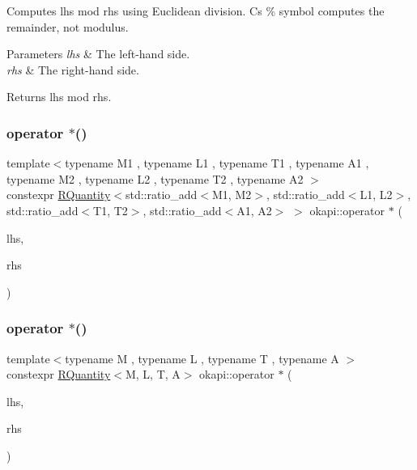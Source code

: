 Computes {\ttfamily lhs mod rhs} using Euclidean division. C\textquotesingle{}s {\ttfamily \%} symbol computes the remainder, not modulus.


\begin{DoxyParams}{Parameters}
{\em lhs} & The left-\/hand side. \\
\hline
{\em rhs} & The right-\/hand side. \\
\hline
\end{DoxyParams}
\begin{DoxyReturn}{Returns}
{\ttfamily lhs} mod {\ttfamily rhs}. 
\end{DoxyReturn}
\mbox{\label{namespaceokapi_a48bcd0bd9113d86c24325eb1003709de}} 
\subsubsection{\texorpdfstring{operator $\ast$()}{operator *()}\hspace{0.1cm}{\footnotesize\ttfamily [1/4]}}
{\footnotesize\ttfamily template$<$typename M1 , typename L1 , typename T1 , typename A1 , typename M2 , typename L2 , typename T2 , typename A2 $>$ \\
constexpr \mbox{\hyperlink{classokapi_1_1RQuantity}{R\+Quantity}}$<$std\+::ratio\+\_\+add$<$M1, M2$>$, std\+::ratio\+\_\+add$<$L1, L2$>$, std\+::ratio\+\_\+add$<$T1, T2$>$, std\+::ratio\+\_\+add$<$A1, A2$>$ $>$ okapi\+::operator $\ast$ (\begin{DoxyParamCaption}\item[{const \mbox{\hyperlink{classokapi_1_1RQuantity}{R\+Quantity}}$<$ M1, L1, T1, A1 $>$ \&}]{lhs,  }\item[{const \mbox{\hyperlink{classokapi_1_1RQuantity}{R\+Quantity}}$<$ M2, L2, T2, A2 $>$ \&}]{rhs }\end{DoxyParamCaption})}

\mbox{\label{namespaceokapi_a2ff902d0db2898d581528d1aa92f7005}} 
\subsubsection{\texorpdfstring{operator $\ast$()}{operator *()}\hspace{0.1cm}{\footnotesize\ttfamily [2/4]}}
{\footnotesize\ttfamily template$<$typename M , typename L , typename T , typename A $>$ \\
constexpr \mbox{\hyperlink{classokapi_1_1RQuantity}{R\+Quantity}}$<$M, L, T, A$>$ okapi\+::operator $\ast$ (\begin{DoxyParamCaption}\item[{const double \&}]{lhs,  }\item[{const \mbox{\hyperlink{classokapi_1_1RQuantity}{R\+Quantity}}$<$ M, L, T, A $>$ \&}]{rhs }\end{DoxyParamCaption})}

